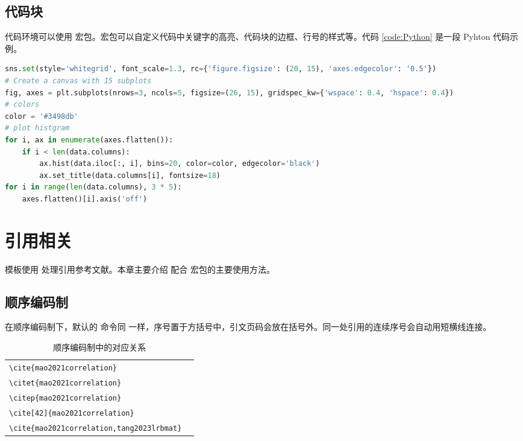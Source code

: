 \documentclass[
    report,     %
    oneside,    %
    UTF8,       %
    zihao=-4    %
]{config} %
\begin{document}
\section{代码块}

代码环境可以使用  宏包。宏包可以自定义代码中关键字的高亮、代码块的边框、行号的样式等。代码 \ref{code:Python} 是一段 Pyhton 代码示例。


\vspace{-0.5em}
\begin{lstlisting}[label=code:Python, language=Python, caption=Python 代码示例]
sns.set(style='whitegrid', font_scale=1.3, rc={'figure.figsize': (20, 15), 'axes.edgecolor': '0.5'})
# Create a canvas with 15 subplots
fig, axes = plt.subplots(nrows=3, ncols=5, figsize=(26, 15), gridspec_kw={'wspace': 0.4, 'hspace': 0.4})
# colors
color = '#3498db'
# plot histgram
for i, ax in enumerate(axes.flatten()):
    if i < len(data.columns): 
        ax.hist(data.iloc[:, i], bins=20, color=color, edgecolor='black')
        ax.set_title(data.columns[i], fontsize=18)  
for i in range(len(data.columns), 3 * 5):
    axes.flatten()[i].axis('off')
\end{lstlisting}
\vspace{0.1em}




\chapter{引用相关}

模板使用  处理引用参考文献。本章主要介绍  配合  宏包的主要使用方法\cite{mao2021correlation,tang2023lrbmat}。

\section{顺序编码制}

在顺序编码制下，默认的  命令同  一样，序号置于方括号中，引文页码会放在括号外。同一处引用的连续序号会自动用短横线连接。

\begin{table}[H]
  \centering
  \caption{顺序编码制中的对应关系}
      \begin{tabular}{l@{\quad$\Rightarrow$\quad}l}
      \verb|\cite{mao2021correlation}| & \cite{mao2021correlation}   \\
      \verb|\citet{mao2021correlation}| & \citet{mao2021correlation} \\
      \verb|\citep{mao2021correlation}| & \citep{mao2021correlation} \\
      \verb|\cite[42]{mao2021correlation}| & \cite[42]{mao2021correlation}  \\
      \verb|\cite{mao2021correlation,tang2023lrbmat}| & \cite{mao2021correlation,tang2023lrbmat} \\
      \end{tabular}
\end{table}
\vspace{-0.5em}  %
\end{document}
